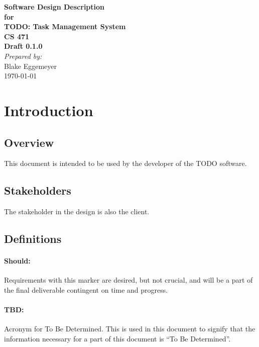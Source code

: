 \documentclass[12pt]{article}
\begin{document}
\begin{titlepage}
\begin{flushright} 
{\LARGE \bfseries Software Design Description}\\[1.2cm]
{\large \bfseries for}\\[1.2cm]
{\huge \bfseries TODO: Task Management System}\\[1.2cm]
{\large \bfseries CS 471}\\
\vfill
{\large \bfseries Draft 0.1.0}\\[2cm]
\emph{Prepared by:} \\
Blake Eggemeyer \\ [3cm]
{\large \today}
\end{flushright}
\end{titlepage}
\setcounter{tocdepth}{3}
\setcounter{secnumdepth}{5}
\tableofcontents
\newpage

\section{Introduction}

\subsection{Overview}
This document is intended to be used by the developer of the TODO software.

\subsection{Stakeholders}
The stakeholder in the design is also the client.

\subsection{Definitions}
\setcounter{paragraph}{0}
\setcounter{subsubsection}{0}
\paragraph{Should:} Requirements with this marker are desired, but not crucial, and will be a part of the final deliverable contingent on time and progress.
\paragraph{TBD:} Acronym for To Be Determined. This is used in this document to signify that the information necessary for a part of this document is ``To Be Determined''.
\end{document}

